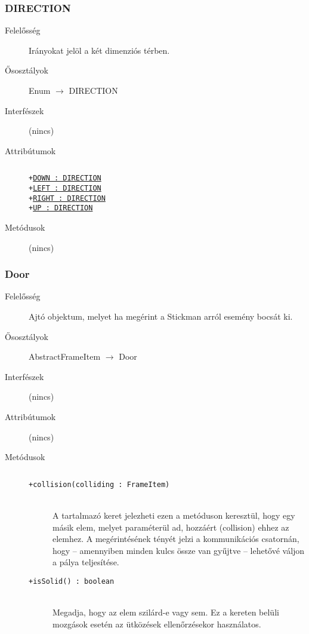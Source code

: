		\subsubsection{DIRECTION}
			\begin{description}

				\item[Felelősség] Irányokat jelöl a két dimenziós térben.

				\item[Ősosztályok] Enum $\rightarrow{}$ DIRECTION
				\item[Interfészek] (nincs)
				\item[Attribútumok]$\ $
					\begin{description}
						\item[\texttt{+\underline{DOWN : DIRECTION}}]%
						\item[\texttt{+\underline{LEFT : DIRECTION}}]%
						\item[\texttt{+\underline{RIGHT : DIRECTION}}]%
						\item[\texttt{+\underline{UP : DIRECTION}}]%
					\end{description}
				\item[Metódusok] (nincs)
			\end{description}

		\subsubsection{Door}
			\begin{description}

				\item[Felelősség] Ajtó objektum, melyet ha megérint a Stickman arról esemény bocsát ki.

				\item[Ősosztályok] AbstractFrameItem $\rightarrow{}$ Door
				\item[Interfészek] (nincs)
				\item[Attribútumok] (nincs)
				\item[Metódusok]$\ $
					\begin{description}
						\item[\texttt{+collision(colliding : FrameItem)}] \hfill \\A tartalmazó keret jelezheti ezen a metóduson keresztül,  hogy egy másik elem, melyet paraméterül ad,  hozzáért (collision) ehhez az elemhez.    A megérintésének tényét jelzi a kommunikációs csatornán,  hogy -- amennyiben minden kulcs össze van gyűjtve --  lehetővé váljon a pálya teljesítése. 
						\item[\texttt{+isSolid() : boolean}] \hfill \\Megadja, hogy az elem szilárd-e vagy sem.  Ez a kereten belüli mozgások esetén az  ütközések ellenőrzésekor használatos. 
					\end{description}
			\end{description}

